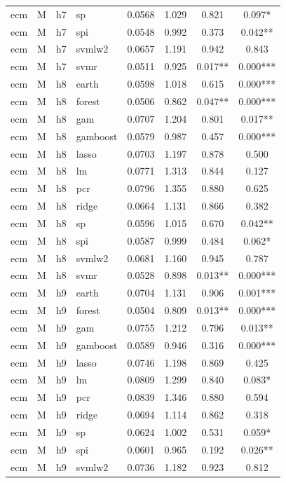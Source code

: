 \begin{ThreePartTable}
\begin{longtable}[t]{llclcccc}
ecm & M & h7 & sp & 0.0568 & 1.029 & 0.821 & 0.097*\\
ecm & M & h7 & spi & 0.0548 & 0.992 & 0.373 & 0.042**\\
ecm & M & h7 & svmlw2 & 0.0657 & 1.191 & 0.942 & 0.843\\
ecm & M & h7 & svmr & 0.0511 & 0.925 & 0.017** & 0.000***\\
\addlinespace
ecm & M & h8 & earth & 0.0598 & 1.018 & 0.615 & 0.000***\\
ecm & M & h8 & forest & 0.0506 & 0.862 & 0.047** & 0.000***\\
ecm & M & h8 & gam & 0.0707 & 1.204 & 0.801 & 0.017**\\
ecm & M & h8 & gamboost & 0.0579 & 0.987 & 0.457 & 0.000***\\
ecm & M & h8 & lasso & 0.0703 & 1.197 & 0.878 & 0.500\\
ecm & M & h8 & lm & 0.0771 & 1.313 & 0.844 & 0.127\\
ecm & M & h8 & pcr & 0.0796 & 1.355 & 0.880 & 0.625\\
ecm & M & h8 & ridge & 0.0664 & 1.131 & 0.866 & 0.382\\
ecm & M & h8 & sp & 0.0596 & 1.015 & 0.670 & 0.042**\\
ecm & M & h8 & spi & 0.0587 & 0.999 & 0.484 & 0.062*\\
ecm & M & h8 & svmlw2 & 0.0681 & 1.160 & 0.945 & 0.787\\
ecm & M & h8 & svmr & 0.0528 & 0.898 & 0.013** & 0.000***\\
\addlinespace
ecm & M & h9 & earth & 0.0704 & 1.131 & 0.906 & 0.001***\\
ecm & M & h9 & forest & 0.0504 & 0.809 & 0.013** & 0.000***\\
ecm & M & h9 & gam & 0.0755 & 1.212 & 0.796 & 0.013**\\
ecm & M & h9 & gamboost & 0.0589 & 0.946 & 0.316 & 0.000***\\
ecm & M & h9 & lasso & 0.0746 & 1.198 & 0.869 & 0.425\\
ecm & M & h9 & lm & 0.0809 & 1.299 & 0.840 & 0.083*\\
ecm & M & h9 & pcr & 0.0839 & 1.346 & 0.880 & 0.594\\
ecm & M & h9 & ridge & 0.0694 & 1.114 & 0.862 & 0.318\\
ecm & M & h9 & sp & 0.0624 & 1.002 & 0.531 & 0.059*\\
ecm & M & h9 & spi & 0.0601 & 0.965 & 0.192 & 0.026**\\
ecm & M & h9 & svmlw2 & 0.0736 & 1.182 & 0.923 & 0.812\\

\end{longtable}
\end{ThreePartTable}
